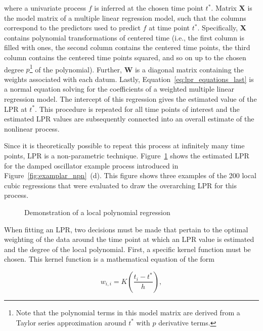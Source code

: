 \documentclass[man, floatsintext]{apa7}
\begin{document}
\noindent where a univariate process $f$ is inferred at the chosen time point
$t^*$. Matrix $\textbf{X}$ is the model matrix of a multiple linear regression
model, such that the columns correspond to the predictors used to predict $f$
at time point $t^*$. Specifically, \textbf{X} contains polynomial
transformations of centered time (i.e., the first column is filled with ones,
the second column contains the centered time points, the third column contains
the centered time points squared, and so on up to the chosen degree
$p$\footnote{Note that the polynomial terms in this model matrix are derived
  from a Taylor series approximation around $t^*$ with $p$ derivative terms.}
of
the polynomial). Further, \textbf{W} is a diagonal matrix containing the
weights associated with each datum. Lastly,
Equation~\ref{eq:lpr_equations_last} is a normal equation solving for the
coefficients of a weighted multiple linear regression model. The intercept of
this regression gives the estimated value of the LPR at $t^*$. This procedure
is repeated for all time points of interest and the estimated LPR values are
subsequently connected into an overall estimate of the nonlinear process.

Since it is theoretically possible to repeat this process at infinitely many
time points, LPR is a non-parametric technique. Figure~\ref{fig:locpol_dem}
shows the estimated LPR for the damped oscillator example process introduced in
Figure~\ref{fig:examplar_npn}~(d). This figure shows three examples of the 200
local cubic regressions that were evaluated to draw the overarching LPR for
this process.

\begin{figure}[!t]
  \caption{Demonstration of a local polynomial regression}
  \label{fig:locpol_dem}
\end{figure}

When fitting an LPR, two decisions must be made that pertain to the optimal
weighting of the data around the time point at which an LPR value is estimated
and the degree of the local polynomial. First, a specific kernel function must
be chosen. This kernel function is a mathematical equation of the form

\begin{equation}
  w_{i, i} = K(\frac{t_i - t^*}{h}),
\end{equation}
\end{document}
